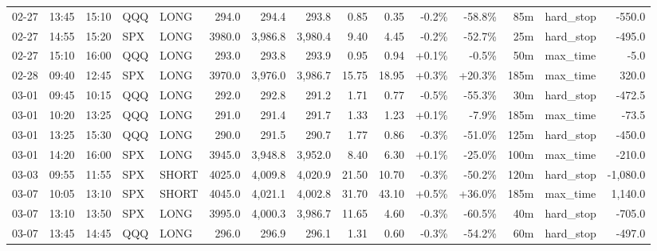 \documentclass[11pt,a4paper,twoside]{article}
\begin{document}
\begin{landscape}
\begin{center}
\begin{longtable}{>{\color{txtmain}}l l l l l r r r r r r r r >{\color{txtmain}}l r}
02-27 & 13:45 & 15:10 & QQQ & LONG & 294.0 & 294.4 & 293.8 & 0.85 & 0.35 & \textcolor{lossred}{-0.2\%} & \textcolor{lossred}{-58.8\%} & 85m & hard\_stop & \textcolor{lossred}{-550.0} \\
02-27 & 14:55 & 15:20 & SPX & LONG & 3980.0 & 3,986.8 & 3,980.4 & 9.40 & 4.45 & \textcolor{lossred}{-0.2\%} & \textcolor{lossred}{-52.7\%} & 25m & hard\_stop & \textcolor{lossred}{-495.0} \\
02-27 & 15:10 & 16:00 & QQQ & LONG & 293.0 & 293.8 & 293.9 & 0.95 & 0.94 & \textcolor{wingreen}{+0.1\%} & \textcolor{lossred}{-0.5\%} & 50m & max\_time & \textcolor{lossred}{-5.0} \\
02-28 & 09:40 & 12:45 & SPX & LONG & 3970.0 & 3,976.0 & 3,986.7 & 15.75 & 18.95 & \textcolor{wingreen}{+0.3\%} & \textcolor{wingreen}{+20.3\%} & 185m & max\_time & \textcolor{wingreen}{320.0} \\
03-01 & 09:45 & 10:15 & QQQ & LONG & 292.0 & 292.8 & 291.2 & 1.71 & 0.77 & \textcolor{lossred}{-0.5\%} & \textcolor{lossred}{-55.3\%} & 30m & hard\_stop & \textcolor{lossred}{-472.5} \\
03-01 & 10:20 & 13:25 & QQQ & LONG & 291.0 & 291.4 & 291.7 & 1.33 & 1.23 & \textcolor{wingreen}{+0.1\%} & \textcolor{lossred}{-7.9\%} & 185m & max\_time & \textcolor{lossred}{-73.5} \\
03-01 & 13:25 & 15:30 & QQQ & LONG & 290.0 & 291.5 & 290.7 & 1.77 & 0.86 & \textcolor{lossred}{-0.3\%} & \textcolor{lossred}{-51.0\%} & 125m & hard\_stop & \textcolor{lossred}{-450.0} \\
03-01 & 14:20 & 16:00 & SPX & LONG & 3945.0 & 3,948.8 & 3,952.0 & 8.40 & 6.30 & \textcolor{wingreen}{+0.1\%} & \textcolor{lossred}{-25.0\%} & 100m & max\_time & \textcolor{lossred}{-210.0} \\
03-03 & 09:55 & 11:55 & SPX & SHORT & 4025.0 & 4,009.8 & 4,020.9 & 21.50 & 10.70 & \textcolor{lossred}{-0.3\%} & \textcolor{lossred}{-50.2\%} & 120m & hard\_stop & \textcolor{lossred}{-1,080.0} \\
03-07 & 10:05 & 13:10 & SPX & SHORT & 4045.0 & 4,021.1 & 4,002.8 & 31.70 & 43.10 & \textcolor{wingreen}{+0.5\%} & \textcolor{wingreen}{+36.0\%} & 185m & max\_time & \textcolor{wingreen}{1,140.0} \\
03-07 & 13:10 & 13:50 & SPX & LONG & 3995.0 & 4,000.3 & 3,986.7 & 11.65 & 4.60 & \textcolor{lossred}{-0.3\%} & \textcolor{lossred}{-60.5\%} & 40m & hard\_stop & \textcolor{lossred}{-705.0} \\
03-07 & 13:45 & 14:45 & QQQ & LONG & 296.0 & 296.9 & 296.1 & 1.31 & 0.60 & \textcolor{lossred}{-0.3\%} & \textcolor{lossred}{-54.2\%} & 60m & hard\_stop & \textcolor{lossred}{-497.0} \\

\end{longtable}
\end{center}
\end{landscape}
\end{document}
